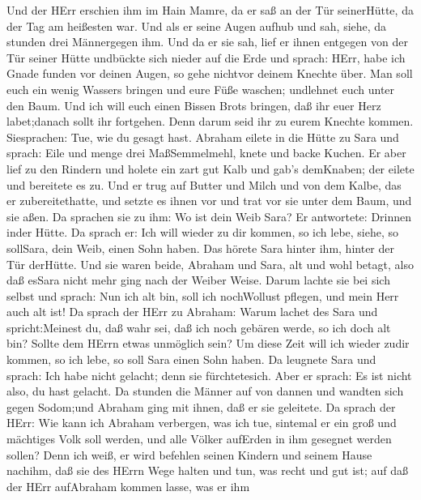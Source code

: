 Und der HErr erschien ihm im Hain Mamre, da er saß an der
Tür seinerHütte, da der Tag am heißesten war.  Und als er
seine Augen aufhub und sah, siehe, da stunden drei Männergegen ihm. Und
da er sie sah, lief er ihnen entgegen von der Tür seiner Hütte undbückte
sich nieder auf die Erde  und sprach: HErr, habe ich Gnade
funden vor deinen Augen, so gehe nichtvor deinem Knechte über.
 Man soll euch ein wenig Wassers bringen und eure Füße
waschen; undlehnet euch unter den Baum.  Und ich will euch
einen Bissen Brots bringen, daß ihr euer Herz labet;danach sollt ihr
fortgehen. Denn darum seid ihr zu eurem Knechte kommen. Siesprachen:
Tue, wie du gesagt hast.  Abraham eilete in die Hütte zu
Sara und sprach: Eile und menge drei MaßSemmelmehl, knete und backe
Kuchen.  Er aber lief zu den Rindern und holete ein zart gut
Kalb und gab's demKnaben; der eilete und bereitete es zu. 
Und er trug auf Butter und Milch und von dem Kalbe, das er
zubereitethatte, und setzte es ihnen vor und trat vor sie unter dem
Baum, und sie aßen.  Da sprachen sie zu ihm: Wo ist dein
Weib Sara? Er antwortete: Drinnen inder Hütte.  Da sprach
er: Ich will wieder zu dir kommen, so ich lebe, siehe, so sollSara, dein
Weib, einen Sohn haben. Das hörete Sara hinter ihm, hinter der Tür
derHütte.  Und sie waren beide, Abraham und Sara, alt und
wohl betagt, also daß esSara nicht mehr ging nach der Weiber Weise.
 Darum lachte sie bei sich selbst und sprach: Nun ich alt
bin, soll ich nochWollust pflegen, und mein Herr auch alt ist!
 Da sprach der HErr zu Abraham: Warum lachet des Sara und
spricht:Meinest du, daß wahr sei, daß ich noch gebären werde, so ich
doch alt bin?  Sollte dem HErrn etwas unmöglich sein? Um
diese Zeit will ich wieder zudir kommen, so ich lebe, so soll Sara einen
Sohn haben.  Da leugnete Sara und sprach: Ich habe nicht
gelacht; denn sie fürchtetesich. Aber er sprach: Es ist nicht also, du
hast gelacht.  Da stunden die Männer auf von dannen und
wandten sich gegen Sodom;und Abraham ging mit ihnen, daß er sie
geleitete.  Da sprach der HErr: Wie kann ich Abraham
verbergen, was ich tue,  sintemal er ein groß und mächtiges
Volk soll werden, und alle Völker aufErden in ihm gesegnet werden
sollen?  Denn ich weiß, er wird befehlen seinen Kindern und
seinem Hause nachihm, daß sie des HErrn Wege halten und tun, was recht
und gut ist; auf daß der HErr aufAbraham kommen lasse, was er ihm

